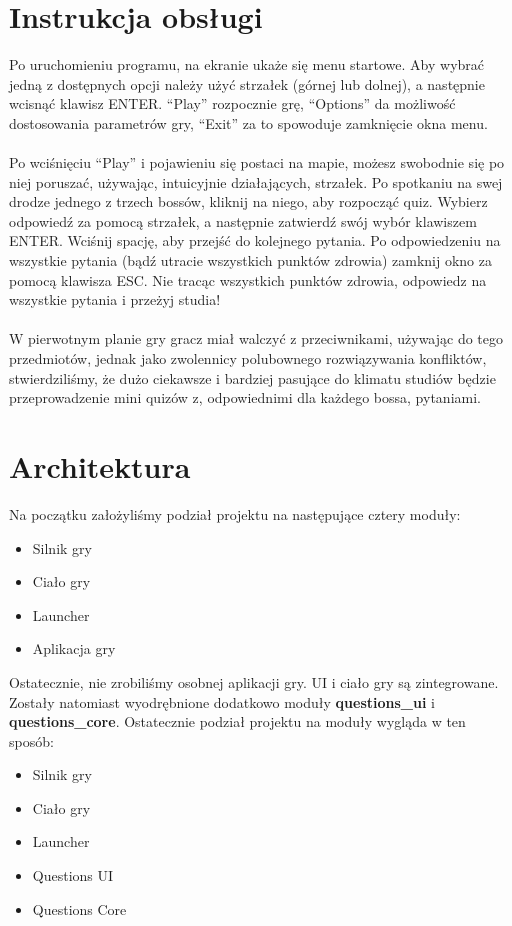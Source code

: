 \documentclass[12pt, titlepage]{article}
\begin{document}
\section{Instrukcja obsługi}
Po uruchomieniu programu, na ekranie ukaże
się menu startowe. Aby wybrać jedną z
dostępnych opcji należy użyć strzałek
(górnej lub dolnej), a następnie wcisnąć
klawisz ENTER. "`Play"' rozpocznie grę,
"`Options"' da możliwość dostosowania
parametrów gry, "`Exit"' za to spowoduje
zamknięcie okna menu.  
\\~\\
Po wciśnięciu "`Play"' i pojawieniu się
postaci na mapie, możesz swobodnie się
po niej poruszać, używając, intuicyjnie
działających, strzałek. Po spotkaniu na
swej drodze jednego z trzech bossów,
kliknij na niego, aby rozpocząć quiz.
Wybierz odpowiedź za pomocą strzałek,
a następnie zatwierdź swój wybór klawiszem
ENTER. Wciśnij spację, aby przejść do
kolejnego pytania. Po odpowiedzeniu na
wszystkie pytania (bądź utracie wszystkich
punktów zdrowia) zamknij okno za pomocą
klawisza ESC. Nie tracąc wszystkich
punktów zdrowia, odpowiedz na wszystkie
pytania i przeżyj studia! 
\\~\\
W pierwotnym planie gry gracz miał
walczyć z przeciwnikami, używając do
tego przedmiotów, jednak jako zwolennicy
polubownego rozwiązywania konfliktów,
stwierdziliśmy, że dużo ciekawsze i
bardziej pasujące do klimatu studiów
będzie przeprowadzenie mini quizów
z, odpowiednimi dla każdego bossa,
pytaniami.

\newpage
\section{Architektura}
Na początku założyliśmy podział projektu
na następujące cztery moduły:
\begin{itemize}
	\item Silnik gry
	\item Ciało gry
	\item Launcher
	\item Aplikacja gry
\end{itemize}

\noindent
Ostatecznie, nie zrobiliśmy osobnej
aplikacji gry. UI i ciało gry są
zintegrowane. Zostały natomiast
wyodrębnione dodatkowo moduły
\textbf{questions\_ui} i
\textbf{questions\_core}.
Ostatecznie podział projektu na
moduły wygląda w ten sposób:
\begin{itemize}
	\item Silnik gry
	\item Ciało gry
	\item Launcher
	\item Questions UI
	\item Questions Core
\end{itemize}
\end{document}
